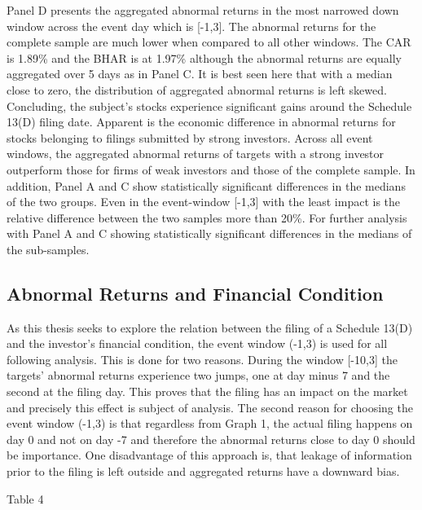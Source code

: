 \documentclass[12pt]{article}
\begin{document}
Panel D presents the aggregated abnormal returns in the most narrowed down window across the event day which is [-1,3]. The abnormal returns for the complete sample are much lower when compared to all other windows. The CAR is 1.89\% and the BHAR is at 1.97\% although the abnormal returns are equally aggregated over 5 days as in Panel C. It is best seen here that with a median close to zero, the distribution of aggregated abnormal returns is left skewed.
Concluding, the subject's stocks experience significant gains around the Schedule 13(D) filing date. Apparent is the economic difference in abnormal returns for stocks belonging to filings submitted by strong investors. Across all event windows, the aggregated abnormal returns of targets with a strong investor outperform those for firms of weak investors and those of the complete sample. In addition, Panel A and C  show statistically significant differences in the medians of the two groups. Even in the event-window [-1,3] with the least impact is the relative difference between the two samples more than 20\%. 
For further analysis with Panel A and C showing statistically significant differences in the medians of the sub-samples. 

\pagebreak

\subsection{Abnormal Returns and Financial Condition}

As this thesis seeks to explore the relation between the filing of a Schedule 13(D) and the investor's financial condition, the event window (-1,3) is used for all following analysis. This is done for two reasons. During the window [-10,3] the targets' abnormal returns experience two jumps, one at day minus 7 and the second at the filing day. This proves that the filing has an impact on the market and precisely this effect is subject of analysis. The second reason for choosing the event window (-1,3) is that regardless from Graph 1, the actual filing happens on day 0 and not on day -7 and therefore the abnormal returns close to day 0 should be importance. One disadvantage of this approach is, that leakage of information prior to the filing is left outside and aggregated returns have a downward bias.



Table 4 
  
\end{document}
